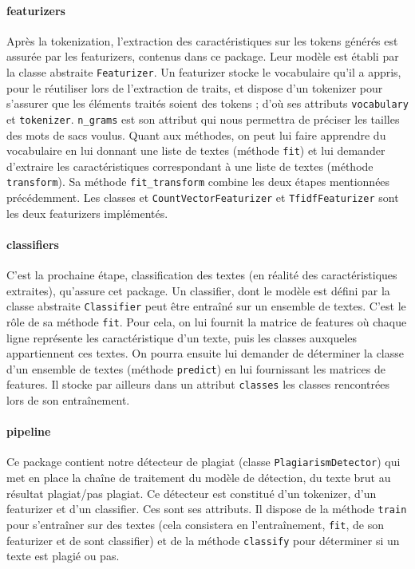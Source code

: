 \paragraph{featurizers}  
Après la tokenization, l'extraction des caractéristiques sur les tokens générés est assurée par les featurizers, contenus dans ce package. Leur modèle est établi par la classe abstraite \texttt{Featurizer}. Un featurizer stocke le vocabulaire qu'il a appris, pour le réutiliser lors de l'extraction de traits, et dispose d'un tokenizer pour s'assurer que les éléments traités soient des tokens ; d'où ses attributs \texttt{vocabulary} et \texttt{tokenizer}. \texttt{n\_grams} est son attribut qui nous permettra de préciser les tailles des mots de sacs voulus. Quant aux méthodes, on peut lui faire apprendre du vocabulaire en lui donnant une liste de textes (méthode \texttt{fit}) et lui demander d'extraire les caractéristiques correspondant à une liste de textes (méthode \texttt{transform}). Sa méthode \texttt{fit\_transform} combine les deux étapes mentionnées précédemment. Les classes et \texttt{CountVectorFeaturizer} et \texttt{TfidfFeaturizer} sont les deux featurizers implémentés.

\paragraph{classifiers}  
C'est la prochaine étape, classification des textes (en réalité des caractéristiques extraites), qu'assure cet package. Un classifier, dont le modèle est défini par la classe abstraite \texttt{Classifier} peut être entraîné sur un ensemble de textes. C'est le rôle de sa méthode \texttt{fit}. Pour cela, on lui fournit la matrice de features où chaque ligne représente les caractéristique d'un texte, puis les classes auxqueles appartiennent ces textes. On pourra ensuite lui demander de déterminer la classe d'un ensemble de textes (méthode \texttt{predict}) en lui fournissant les matrices de features. Il stocke par ailleurs dans un attribut \texttt{classes} les classes rencontrées lors de son entraînement.

\paragraph{pipeline}  
Ce package contient notre détecteur de plagiat (classe \texttt{PlagiarismDetector}) qui met en place la chaîne de traitement du modèle de détection, du texte brut au résultat plagiat/pas plagiat. Ce détecteur est constitué d'un tokenizer, d'un featurizer et d'un classifier. Ces sont ses attributs. Il dispose de la méthode \texttt{train} pour s'entraîner sur des textes (cela consistera en l'entraînement, \texttt{fit}, de son featurizer et de sont classifier) et de la méthode \texttt{classify} pour déterminer si un texte est plagié ou pas.

